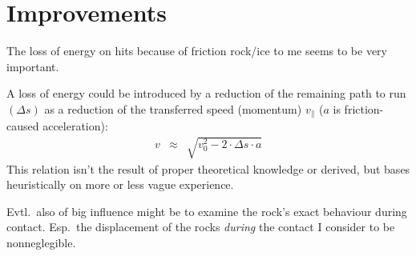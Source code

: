 
\section{Improvements}

The loss of energy on hits because of friction rock/ice
to me seems to be very important.

A loss of energy could be introduced by a reduction of the remaining
path to run $(\Delta s)$ as a reduction of the transferred speed (momentum)
$ v_\parallel $ ($ a $ is friction-caused acceleration):
%
\begin{eqnarray}
v & \approx & \sqrt{ v_0^2 - 2 \cdot \Delta s \cdot a }
\end{eqnarray}
%
This relation isn't the result of proper theoretical knowledge or derived,
but bases heuristically on more or less vague experience.

Evtl.\ also of big influence might be to examine the rock's exact behaviour
during contact. Esp.\ the displacement of the rocks \emph{during} the
contact I consider to be nonneglegible.

